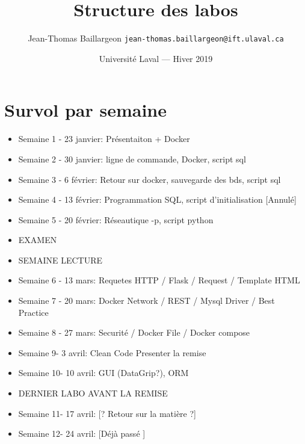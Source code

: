 \documentclass{article}
\title{Structure des labos} %
\author{Jean-Thomas Baillargeon 
\texttt{jean-thomas.baillargeon@ift.ulaval.ca}}%
\date{Université Laval --- Hiver 2019} %
\begin{document}
\maketitle %




\section{Survol par semaine } %
    \begin{itemize}
    \item Semaine 1 - 23 janvier: Présentaiton + Docker
    \item Semaine 2 - 30 janvier: ligne de commande, Docker, script sql
    \item Semaine 3 - 6 février: Retour sur docker, sauvegarde des bds, script sql
    \item Semaine 4 - 13 février: Programmation SQL, script d'initialisation [Annulé]
    \item Semaine 5 - 20 février: Réseautique -p, script python
    \item EXAMEN
    \item SEMAINE LECTURE
    \item Semaine 6 - 13 mars: Requetes HTTP / Flask / Request / Template HTML
    \item Semaine 7 - 20 mars: Docker Network / REST / Mysql Driver / Best Practice
    \item Semaine 8 - 27 mars: Securité / Docker File / Docker compose
    \item Semaine 9- 3 avril: Clean Code Presenter la remise
    \item Semaine 10- 10 avril: GUI (DataGrip?), ORM  
    \item DERNIER LABO AVANT LA REMISE
    \item Semaine 11- 17 avril: [? Retour sur la matière ?]
    \item Semaine 12- 24 avril: [Déjà passé ]
    
        
    \end{itemize}
\end{document}
